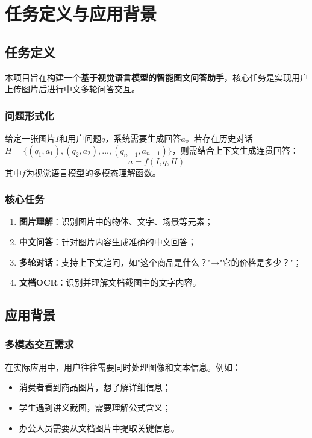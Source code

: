 
\chapter{任务定义与应用背景}
\label{cha:introduction}

\section{任务定义}
\label{sec:task_definition}

本项目旨在构建一个\textbf{基于视觉语言模型的智能图文问答助手}，核心任务是实现用户上传图片后进行中文多轮问答交互。

\subsection{问题形式化}

给定一张图片$I$和用户问题$q$，系统需要生成回答$a$。若存在历史对话$H = \{(q_1, a_1), (q_2, a_2), ..., (q_{n-1}, a_{n-1})\}$，则需结合上下文生成连贯回答：
\begin{equation}
  a = f(I, q, H)
\end{equation}
其中$f$为视觉语言模型的多模态理解函数。

\subsection{核心任务}

\begin{enumerate}
  \item \textbf{图片理解}：识别图片中的物体、文字、场景等元素；
  \item \textbf{中文问答}：针对图片内容生成准确的中文回答；
  \item \textbf{多轮对话}：支持上下文追问，如"这个商品是什么？"→"它的价格是多少？"；
  \item \textbf{文档OCR}：识别并理解文档截图中的文字内容。
\end{enumerate}

\section{应用背景}
\label{sec:background}

\subsection{多模态交互需求}

在实际应用中，用户往往需要同时处理图像和文本信息。例如：
\begin{itemize}
  \item 消费者看到商品图片，想了解详细信息；
  \item 学生遇到讲义截图，需要理解公式含义；
  \item 办公人员需要从文档图片中提取关键信息。
\end{itemize}


